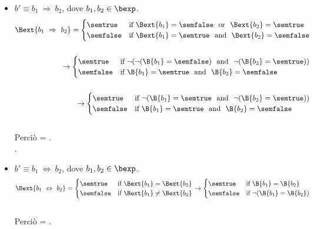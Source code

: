 {\begin{enumerate}[label=(\alph*)]
\begin{itemize}
    \item $ b' \equiv b_1 \ \Rightarrow \ b_2$, dove $b_1, b_2 \in \bexp$. \\
    \begin{align*}
      \Bext{b_1 \ \Rightarrow \ b_2} =
      \begin{cases}
      \semtrue &
      \mbox{if} \ \Bext{b_1} = \semfalse \ \mbox{ or } \
                \Bext{b_2} = \semtrue\\
      \semfalse &
      \mbox{if} \ \Bext{b_1} = \semtrue \ \mbox{ and } \
                \Bext{b_2} = \semfalse \\
      \end{cases} \\ \\
      \rightarrow
      \begin{cases}
      \semtrue &
      \mbox{if} \ \lnot ( \lnot (\B{b_1} = \semfalse)
                \ \mbox{ and } \
                \lnot (\B{b_2} = \semtrue))\\
      \semfalse &
      \mbox{if} \ \B{b_1} = \semtrue \ \mbox{ and } \
                \B{b_2} = \semfalse \\
      \end{cases}  \\ \\
      \rightarrow
      \begin{cases}
      \semtrue &
      \mbox{if} \ \lnot ( \B{b_1} = \semtrue
                \ \mbox{ and } \
                \lnot (\B{b_2} = \semtrue))\\
      \semfalse &
      \mbox{if} \ \B{b_1} = \semtrue \ \mbox{ and } \
                \B{b_2} = \semfalse \\
      \end{cases}
    \end{align*} \\
      Perciò \Bext{b_1 \ \Rightarrow \ b_2} =
      . \\.

    \item $ b' \equiv b_1 \ \Leftrightarrow \ b_2$, dove $b_1, b_2 \in \bexp$.
    \\
    \begin{align*}
      \Bext{b_1 \ \Leftrightarrow \ b_2} = 
      \begin{cases} 
      \semtrue & 
      \mbox{if} \ \Bext{b_1} = \Bext{b_2}\\
      \semfalse & 
      \mbox{if} \ \Bext{b_1} \neq \Bext{b_2}\\
      \end{cases} 
      \rightarrow
      \begin{cases} 
      \semtrue & 
      \mbox{if} \ \B{b_1} = \B{b_2}\\
      \semfalse & 
      \mbox{if} \ \lnot (\B{b_1} = \B{b_2})\\
      \end{cases} 
    \end{align*} \\
      Perciò  = . \\


\end{itemize}
\end{enumerate}}
